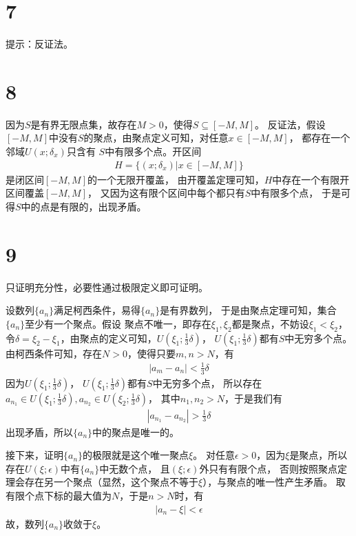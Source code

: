 \documentclass{article}
\begin{document}
\section*{7}

提示：反证法。

\section*{8}

因为$S$是有界无限点集，故存在$M > 0$，使得$S \subseteq [-M, M]$。
反证法，假设$[-M, M]$中没有$S$的聚点，由聚点定义可知，对任意$x \in [-M, M]$，
都存在一个邻域$U(x; \delta_x)$只含有
$S$中有限多个点。开区间
\begin{align*}
  H = \{(x; \delta_x)| x \in [-M, M]\}
\end{align*}
是闭区间$[-M, M]$的一个无限开覆盖，
由开覆盖定理可知，$H$中存在一个有限开区间覆盖$[-M, M]$，
又因为这有限个区间中每个都只有$S$中有限多个点，
于是可得$S$中的点是有限的，出现矛盾。

\section*{9}

只证明充分性，必要性通过极限定义即可证明。

设数列$\{a_n\}$满足柯西条件，易得$\{a_n\}$是有界数列，
于是由聚点定理可知，集合$\{a_n\}$至少有一个聚点。假设
聚点不唯一，即存在$\xi_1, \xi_2$都是聚点，不妨设$\xi_1 < \xi_2$，
令$\delta = \xi_2 - \xi_1$，由聚点的定义可知，$U(\xi_1; \frac{1}{3}\delta)$，
$U(\xi_1; \frac{1}{3}\delta)$都有$S$中无穷多个点。
由柯西条件可知，存在$N > 0$，使得只要$m, n > N$，有
\begin{align*}
  |a_m - a_n| < \frac{1}{3}\delta
\end{align*}
因为$U(\xi_1; \frac{1}{3}\delta)$，
$U(\xi_1; \frac{1}{3}\delta)$都有$S$中无穷多个点，
所以存在$a_{n_1} \in U(\xi_1; \frac{1}{3}\delta), a_{n_2} \in U(\xi_2; \frac{1}{3}\delta)$，
其中$n_1, n_2 > N$，于是我们有
\begin{align*}
  |a_{n_1} - a_{n_2}| > \frac{1}{3}\delta
\end{align*}
出现矛盾，所以$\{a_n\}$中的聚点是唯一的。

接下来，证明$\{a_n\}$的极限就是这个唯一聚点$\xi$。
对任意$\epsilon > 0$，因为$\xi$是聚点，所以存在$U(\xi; \epsilon)$中有$\{a_n\}$中无数个点，
且$(\xi; \epsilon)$外只有有限个点，
否则按照聚点定理会存在另一个聚点（显然，这个聚点不等于$\xi$），与聚点的唯一性产生矛盾。
取有限个点下标的最大值为$N$，于是$n > N$时，有
\begin{align*}
  |a_n - \xi| < \epsilon
\end{align*}
故，数列$\{a_n\}$收敛于$\xi$。
\end{document}
